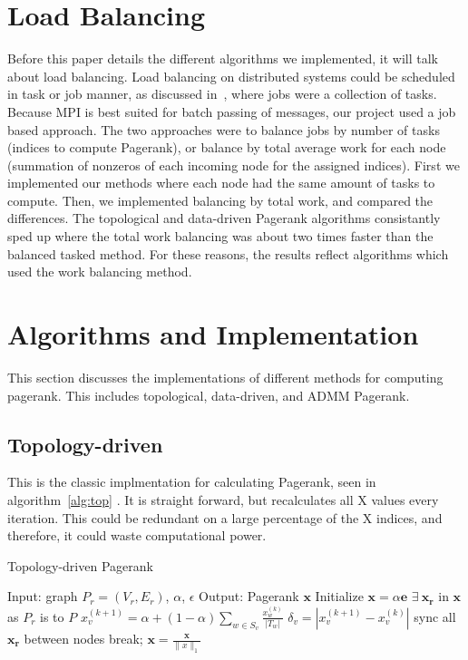 \documentclass[letterpaper,11pt,onecolumn]{article}
\begin{document}
\section{Load Balancing}
Before this paper details the different algorithms we implemented, it will talk about load balancing. Load balancing on distributed systems could be scheduled in task or job manner, as discussed in~\cite{distributed}, where jobs were a collection of tasks. Because MPI is best suited for batch passing of messages, our project used a job based approach. The two approaches were to balance jobs by number of tasks (indices to compute Pagerank), or balance by total average work for each node (summation of nonzeros of each incoming node for the assigned indices). First we implemented our methods where each node had the same amount of tasks to compute. Then, we implemented balancing by total work, and compared the differences. The topological and data-driven Pagerank algorithms consistantly sped up where the total work balancing was about two times faster than the balanced tasked method. For these reasons, the results reflect algorithms which used the work balancing method. 

\section{Algorithms and Implementation}

This section discusses the implementations of different methods for computing pagerank. This includes topological, data-driven, and ADMM Pagerank. 

\subsection{Topology-driven}
This is the classic implmentation for calculating Pagerank, seen in algorithm~\ref{alg:top} . It is straight forward, but recalculates all X values every iteration. This could be redundant on a large percentage of the X indices, and therefore, it could waste computational power. 

\begin{algorithm}
\caption{Topology-driven Pagerank}
\label{alg:top}
\begin{algorithmic}[1]
  \STATE Input: graph $P_{r} = (V_r, E_r)$, $\alpha$, $\epsilon$
  \STATE Output: Pagerank $\mathbf{x}$
  \STATE Initialize $\mathbf{x} = \alpha \mathbf{e}$
  \STATE $\exists  \medspace \mathbf{x_r}$ in $\mathbf{x}$ as $P_r$ is to $P$
		\STATE $x_{v}^{(k+1)} = \alpha + (1 - \alpha) \sum_{w \in S_v} \frac{x_{w}^{(k)}}{|T_w|} $
		\STATE $\delta_{v} = | x_{v}^{(k+1)} - x_{v}^{(k)} | $
	\ENDFOR
	\STATE sync all $\mathbf{x_r}$ between nodes
	\IF{$\|\delta \|_{\infty} < \epsilon$}
		\STATE break;
	\ENDIF
  \ENDWHILE
  \STATE $\mathbf{x} = \frac{\mathbf{x} }{\|x\|_{1}}$
\end{algorithmic}
\end{algorithm}
\end{document}
